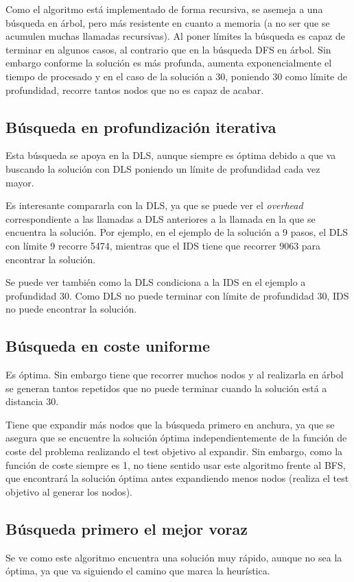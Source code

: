 \documentclass{article}
\begin{document}
Como el algoritmo está implementado de forma recursiva, se asemeja a una búsqueda en árbol, pero más resistente en cuanto a memoria (a no ser que se acumulen muchas llamadas recursivas). Al poner límites la búsqueda es capaz de terminar en algunos casos, al contrario que en la búsqueda DFS en árbol. Sin embargo conforme la solución es más profunda, aumenta exponencialmente el tiempo de procesado y en el caso de la solución a 30, poniendo 30 como límite de profundidad, recorre tantos nodos que no es capaz de acabar.

\subsection{Búsqueda en profundización iterativa}
Esta búsqueda se apoya en la DLS, aunque siempre es óptima debido a que va buscando la solución con DLS poniendo un límite de profundidad cada vez mayor.

Es interesante compararla con la DLS, ya que se puede ver el \textit{overhead} correspondiente a las llamadas a DLS anteriores a la llamada en la que se encuentra la solución. Por ejemplo, en el ejemplo de la solución  a 9 pasos, el DLS con límite 9 recorre 5474, mientras que el IDS tiene que recorrer 9063 para encontrar la solución.

Se puede ver también como la DLS condiciona a la IDS en el ejemplo a profundidad 30. Como DLS no puede terminar con límite de profundidad 30, IDS no puede encontrar la solución.

\subsection{Búsqueda en coste uniforme}
Es óptima. Sin embargo tiene que recorrer muchos nodos y al realizarla en árbol se generan tantos repetidos que no puede terminar cuando la solución está a distancia 30. 

Tiene que expandir más nodos que la búsqueda primero en anchura, ya que se asegura que se encuentre la solución óptima independientemente de la función de coste del problema realizando el test objetivo al expandir. Sin embargo, como la función de coste siempre es 1, no tiene sentido usar este algoritmo frente al BFS, que encontrará la solución óptima antes expandiendo menos nodos (realiza el test objetivo al generar los nodos).

\subsection{Búsqueda primero el mejor voraz}
Se ve como este algoritmo encuentra una solución muy rápido, aunque no sea la óptima, ya que va siguiendo el camino que marca la heurística.
\end{document}
